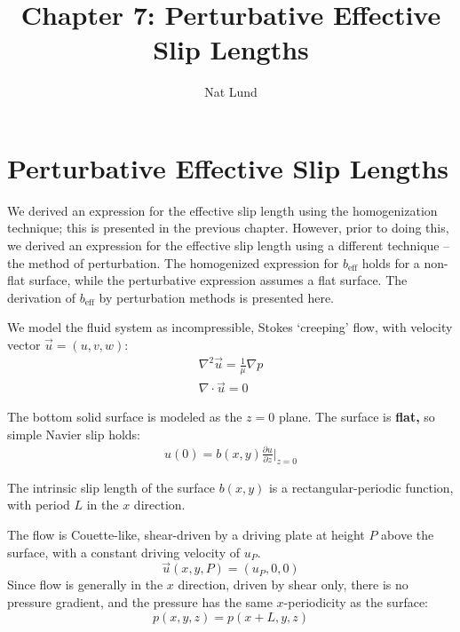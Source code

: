 \documentclass[12pt, a4paper, twoside, openright]{book}
\title{Chapter 7: Perturbative Effective Slip Lengths}
\author{Nat Lund}
\newcommand{\beff}{\ensuremath{b_{\mathrm{eff}}}}
\begin{document}
\chapter{Perturbative Effective Slip Lengths}

We derived an expression for the effective slip length using the homogenization technique; this is presented in the previous chapter.  However, prior to doing this, we derived an expression for the effective slip length using a different technique -- the method of perturbation.  The homogenized expression for $\beff$ holds for a non-flat surface, while the perturbative expression assumes a flat surface.
The derivation of $\beff$ by perturbation methods is presented here.

\vspace{1em}

We model the fluid system as incompressible, Stokes `creeping' flow, with velocity vector $\vec{u} = (u,v,w)$: 
\begin{gather}
\nabla^2 \vec{u} = \frac{1}{\mu} \nabla p  \\
\nabla \cdot \vec{u} = 0
\end{gather}

The bottom solid surface is modeled as the $z=0$ plane.  
The surface is \textbf{flat,} so simple Navier slip holds:
\begin{gather}
u(0) = b(x,y) \frac{\partial u}{\partial z} \rvert_{z=0}
\end{gather}

The intrinsic slip length of the surface $b(x,y)$ is a rectangular-periodic function, with period $L$ in the $x$ direction.

The flow is Couette-like, shear-driven by a driving plate at height $P$ above the surface, with a constant driving velocity of $u_P$.
\begin{equation}
\vec{u}(x,y,P) = (u_P,0,0)
\end{equation}
Since flow is generally in the $x$ direction, driven by shear only, there is no pressure gradient, and the pressure has the same $x$-periodicity as the surface:
\begin{equation}
p(x,y,z) = p(x+L,y,z)
\end{equation}


\end{document}
